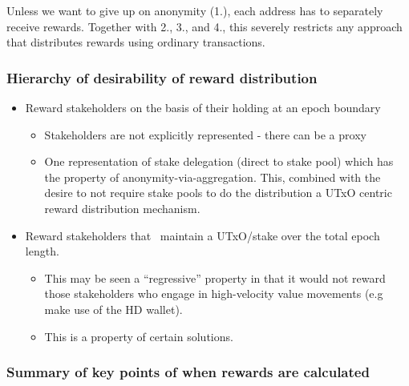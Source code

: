 \documentclass[11pt,a4paper]{article}
\begin{document}
Unless we want to give up on anonymity (1.), each address has to
separately receive rewards. Together with 2., 3., and 4., this severely
restricts any approach that distributes rewards using ordinary
transactions.

\subsubsection{Hierarchy of desirability of reward distribution}
\label{hierarchy-of-desirability-of-reward-distribution}

\begin{itemize}
\item
  Reward stakeholders on the basis of their holding at an epoch boundary

  \begin{itemize}
  \item
    Stakeholders are not explicitly represented - there can be a proxy
  \item
    One representation of stake delegation (direct to stake pool) which
    has the property of anonymity-via-aggregation. This, combined with
    the desire to not require stake pools to do the distribution a UTxO
    centric reward distribution mechanism.
  \end{itemize}
\item
  Reward stakeholders that ~maintain a UTxO/stake over the total epoch
  length.

  \begin{itemize}
  \item
    This may be seen a ``regressive'' property in that it would not
    reward those stakeholders who engage in high-velocity value
    movements (e.g make use of the HD wallet).
  \item
    This is a property of certain solutions.
  \end{itemize}
\end{itemize}

\subsubsection{Summary of key points of when rewards are calculated}
\label{summary-of-key-points-of-when-rewards-are-calculated}
\end{document}
